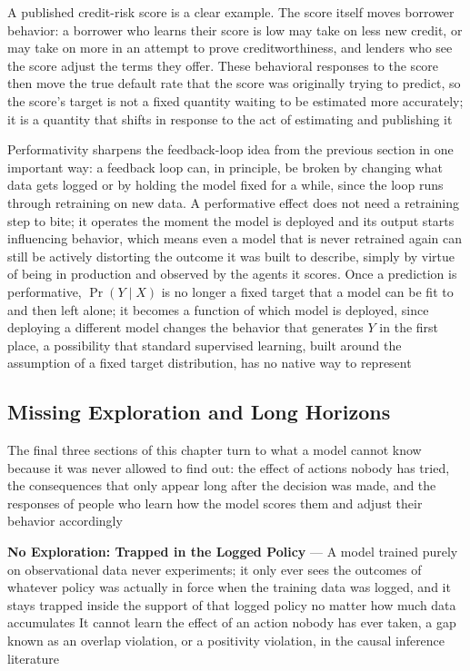 A published credit-risk score is a clear example. The score itself moves
borrower behavior: a borrower who learns their score is low may take on less new
credit, or may take on more in an attempt to prove creditworthiness, and lenders
who see the score adjust the terms they offer. These behavioral responses to the
score then move the true default rate that the score was originally trying to
predict, so the score's target is not a fixed quantity waiting to be estimated more
accurately; it is a quantity that shifts in response to the act of estimating
and publishing it

Performativity sharpens the feedback-loop idea from the previous section in one important
way: a feedback loop can, in principle, be broken by changing what data gets
logged or by holding the model fixed for a while, since the loop runs through retraining
on new data. A performative effect does not need a retraining step to bite; it operates
the moment the model is deployed and its output starts influencing behavior,
which means even a model that is never retrained again can still be actively
distorting the outcome it was built to describe, simply by virtue of being in production
and observed by the agents it scores. Once a prediction is performative, $\Pr(Y \mid
X)$ is no longer a fixed target that a model can be fit to and then left alone;
it becomes a function of which model is deployed, since deploying a different model
changes the behavior that generates $Y$ in the first place, a possibility that
standard supervised learning, built around the assumption of a fixed target distribution,
has no native way to represent

\subsection{Missing Exploration and Long Horizons}
\label{sec:missing-exploration-long-horizons}

The final three sections of this chapter turn to what a model cannot know
because it was never allowed to find out: the effect of actions nobody has tried,
the consequences that only appear long after the decision was made, and the responses
of people who learn how the model scores them and adjust their behavior accordingly

\textbf{No Exploration: Trapped in the Logged Policy} --- A model trained purely
on observational data never experiments; it only ever sees the outcomes of
whatever policy was actually in force when the training data was logged, and it stays
trapped inside the support of that logged policy no matter how much data accumulates
It cannot learn the effect of an action nobody has ever taken, a gap known as an
overlap violation, or a positivity violation, in the causal inference literature

